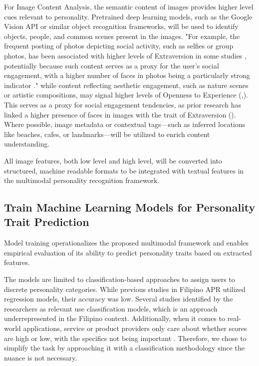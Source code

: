 	For Image Content Analysis, the semantic content of images provides higher level cues relevant to personality. Pretrained deep learning models, such as the Google Vision API or similar object recognition frameworks, will be used to identify objects, people, and common scenes present in the images. "For example, the frequent posting of photos depicting social activity, such as selfies or group photos, has been associated with higher levels of Extraversion in some studies \citep{Barry2019, Danciu2021}, potentially because such content serves as a proxy for the user's social engagement, with a higher number of faces in photos being a particularly strong indicator \citep{Celli2014}."  while content reflecting aesthetic engagement, such as nature scenes or artistic compositions, may signal higher levels of Openness to Experience (\citep{Guntuku2017},\citep{Silvia2015}). This serves as a proxy for social engagement tendencies, as prior research has linked a higher presence of faces in images with the trait of Extraversion (\citep{Celli2014, Ferwerda2016}). Where possible, image metadata or contextual tags—such as inferred locations like beaches, cafes, or landmarks—will be utilized to enrich content understanding.
	
	All image features, both low level and high level, will be converted into structured, machine readable formats to be integrated with textual features in the multimodal personality recognition framework.
	
	\subsection{Train Machine Learning Models for Personality Trait Prediction
	}
	
	Model training operationalizes the proposed multimodal framework and enables empirical evaluation of its ability to predict personality traits based on extracted features.

	The models are limited to classification-based approaches to assign users to discrete personality categories. While previous studies in Filipino APR utilized regression models, their accuracy was low. Several studies identified by the researchers as relevant use classification models, which is an approach underrepresented in the Filipino context. Additionally, when it comes to real-world applications, service or product providers only care about whether scores are high or low, with the specifics not being important \citep{wei2017beyond}. Therefore, we chose to simplify the task by approaching it with a classification methodology since the nuance is not necessary.

